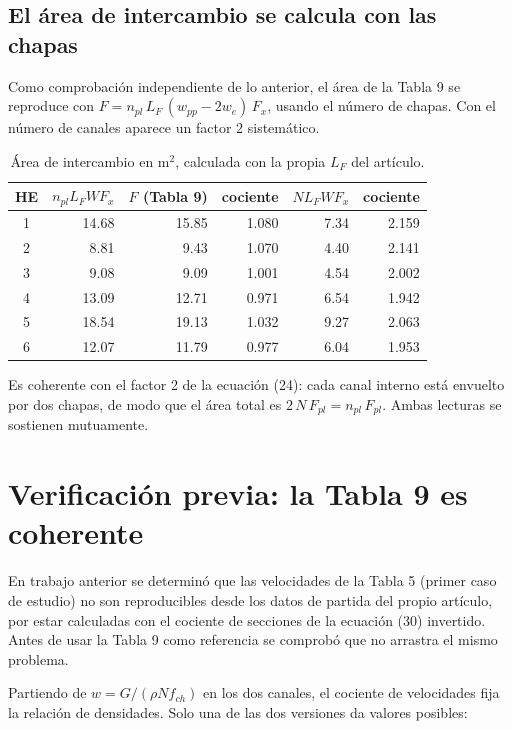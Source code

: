 \documentclass[11pt,a4paper]{article}
\begin{document}
\subsection{El área de intercambio se calcula con las chapas}

Como comprobación independiente de lo anterior, el área de la Tabla 9 se reproduce con
$F = n_{pl}\,L_F\,(w_{pp}-2w_e)\,F_x$, usando el número de chapas. Con el número de canales
aparece un factor $2$ sistemático.

\begin{table}[h]
\centering
\begin{tabular}{crrrrr}
\toprule
HE & $n_{pl}L_F W F_x$ & $F$ (Tabla 9) & cociente & $N L_F W F_x$ & cociente\\
\midrule
1 & 14.68 & 15.85 & 1.080 & 7.34 & 2.159\\
2 &  8.81 &  9.43 & 1.070 & 4.40 & 2.141\\
3 &  9.08 &  9.09 & 1.001 & 4.54 & 2.002\\
4 & 13.09 & 12.71 & 0.971 & 6.54 & 1.942\\
5 & 18.54 & 19.13 & 1.032 & 9.27 & 2.063\\
6 & 12.07 & 11.79 & 0.977 & 6.04 & 1.953\\
\bottomrule
\end{tabular}
\caption{Área de intercambio en m$^2$, calculada con la propia $L_F$ del artículo.}
\end{table}

Es coherente con el factor 2 de la ecuación (24): cada canal interno está envuelto por dos
chapas, de modo que el área total es $2\,N\,F_{pl} = n_{pl}\,F_{pl}$. Ambas lecturas se
sostienen mutuamente.

\section{Verificación previa: la Tabla 9 es coherente}

En trabajo anterior se determinó que las velocidades de la Tabla 5 (primer caso de estudio) no
son reproducibles desde los datos de partida del propio artículo, por estar calculadas con el
cociente de secciones de la ecuación (30) invertido. Antes de usar la Tabla 9 como referencia
se comprobó que no arrastra el mismo problema.

Partiendo de $w = G/(\rho N f_{ch})$ en los dos canales, el cociente de velocidades fija la
relación de densidades. Solo una de las dos versiones da valores posibles:
\end{document}

